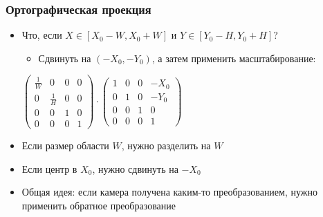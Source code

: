 \documentclass{beamer}
\begin{document}
\begin{frame}[fragile]
\frametitle{Ортографическая проекция}
\begin{itemize}
\item Что, если \begin{math}X \in [X_0 - W, X_0 + W]\end{math} и \begin{math}Y \in [Y_0 - H, Y_0 + H]\end{math}?
\pause
\begin{itemize}
\item Сдвинуть на \begin{math}(-X_0, -Y_0)\end{math}, а затем применить масштабирование:
\end{itemize}
\begin{center}
\begin{math}
\begin{pmatrix}
\frac{1}{W} & 0 & 0 & 0 \\
0 & \frac{1}{H} & 0 & 0 \\
0 & 0 & 1 & 0 \\
0 & 0 & 0 & 1
\end{pmatrix}
\cdot
\begin{pmatrix}
1 & 0 & 0 & -X_0 \\
0 & 1 & 0 & -Y_0 \\
0 & 0 & 1 & 0 \\
0 & 0 & 0 & 1
\end{pmatrix}
\end{math}
\end{center}
\pause
\item Если размер области \begin{math}W\end{math}, нужно разделить на \begin{math}W\end{math}
\item Если центр в \begin{math}X_0\end{math}, нужно сдвинуть на \begin{math}-X_0\end{math}
\pause
\item Общая идея: если камера получена каким-то преобразованием, нужно применить обратное преобразование
\end{itemize}
\end{frame}
\end{document}
